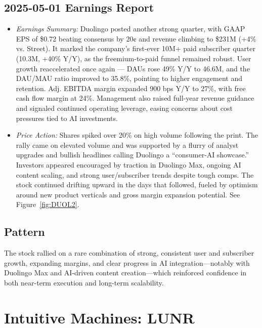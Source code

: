 \documentclass[11pt]{article}
\begin{document}
    \subsection{2025-05-01 Earnings Report}
        \begin{itemize}
            \item \textit{Earnings Summary:} Duolingo posted another strong quarter, with GAAP EPS of \$0.72 beating consensus by 20¢ and revenue climbing to \$231M (+4\% vs. Street). It marked the company’s first-ever 10M+ paid subscriber quarter (10.3M, +40\% Y/Y), as the freemium-to-paid funnel remained robust. User growth reaccelerated once again — DAUs rose 49\% Y/Y to 46.6M, and the DAU/MAU ratio improved to 35.8\%, pointing to higher engagement and retention. Adj. EBITDA margin expanded 900 bps Y/Y to 27\%, with free cash flow margin at 24\%. Management also raised full-year revenue guidance and signaled continued operating leverage, easing concerns about cost pressures tied to AI investments.
            \item \textit{Price Action:} Shares spiked over 20\% on high volume following the print. The rally came on elevated volume and was supported by a flurry of analyst upgrades and bullish headlines calling Duolingo a “consumer-AI showcase.” Investors appeared encouraged by traction in Duolingo Max, ongoing AI content scaling, and strong user/subscriber trends despite tough comps. The stock continued drifting upward in the days that followed, fueled by optimism around new product verticals and gross margin expansion potential. See Figure~\ref{fig:DUOL2}.
        \end{itemize}
    \subsection{Pattern}
        The stock rallied on a rare combination of strong, consistent user and subscriber growth, expanding margins, and clear progress in AI integration—notably with Duolingo Max and AI-driven content creation—which reinforced confidence in both near-term execution and long-term scalability.  
\section{Intuitive Machines: LUNR}
\end{document}
